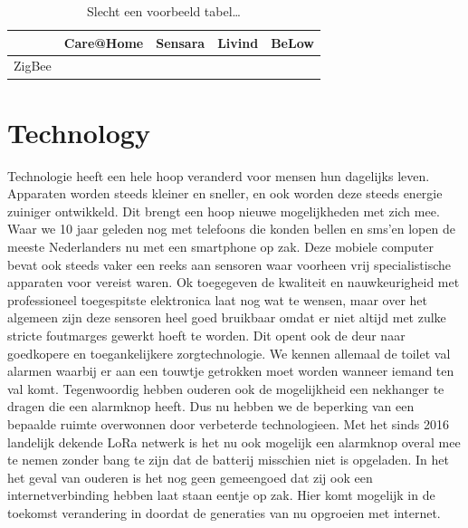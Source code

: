 \documentclass{below-ext}
\newcommand{\cmark}{\ding{51}}%
\newcommand{\xmark}{\ding{55}}%
\begin{document}
\begin{table}
\begin{tabular}{l|l|l|l|l}
& Care@Home & Sensara & Livind & BeLow \\
\hline
ZigBee & \cmark & \cmark & \cmark & \xmark \\
\end{tabular}
\caption{Slecht een voorbeeld tabel\ldots}
\end{table}
\section{Technology}
Technologie heeft een hele hoop veranderd voor mensen hun dagelijks leven. Apparaten worden steeds kleiner en sneller, en ook worden deze steeds energie zuiniger ontwikkeld. Dit brengt een hoop nieuwe mogelijkheden met zich mee. Waar we 10 jaar geleden nog met telefoons die konden bellen en sms'en lopen de meeste Nederlanders nu met een smartphone op zak. Deze mobiele computer bevat ook steeds vaker een reeks aan sensoren waar voorheen vrij specialistische apparaten voor vereist waren. Ok toegegeven de kwaliteit en nauwkeurigheid met professioneel toegespitste elektronica laat nog wat te wensen, maar over het algemeen zijn deze sensoren heel goed bruikbaar omdat er niet altijd met zulke stricte foutmarges gewerkt hoeft te worden. Dit opent ook de deur naar goedkopere en toegankelijkere zorgtechnologie. We kennen allemaal de toilet val alarmen waarbij er aan een touwtje getrokken moet worden wanneer iemand ten val komt. 
Tegenwoordig hebben ouderen ook de mogelijkheid een nekhanger te dragen die een alarmknop heeft. 
Dus nu hebben we de beperking van een bepaalde ruimte overwonnen door verbeterde technologieen. Met het sinds 2016 landelijk dekende LoRa netwerk is het nu ook mogelijk een alarmknop overal mee te nemen zonder bang te zijn dat de batterij misschien niet is opgeladen. In het het geval van ouderen is het nog geen gemeengoed dat zij ook een internetverbinding hebben laat staan eentje op zak. Hier komt mogelijk in de toekomst verandering in doordat de generaties van nu opgroeien met internet.
 
\end{document}
